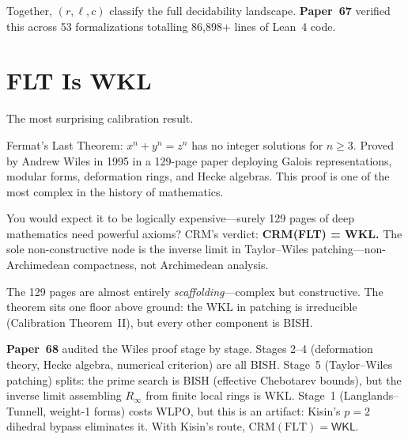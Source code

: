 \documentclass[11pt,twoside,openany]{report}
\theoremstyle{remark}
\newcommand{\BISH}{\textsf{BISH}}
\newcommand{\WKL}{\textsf{WKL}}
\newcommand{\WLPO}{\textsf{WLPO}}
\newcommand{\paperref}[1]{\textbf{Paper~#1}}
\begin{document}
Together, $(r, \ell, c)$ classify the full decidability landscape. \paperref{67} verified this across 53 formalizations totalling 86,898+ lines of Lean~4 code.


\section{FLT Is \WKL}\label{sec:flt}

The most surprising calibration result.

\begin{analogybox}
Fermat's Last Theorem: $x^n + y^n = z^n$ has no integer solutions for $n \geq 3$. Proved by Andrew Wiles in 1995 in a 129-page paper deploying Galois representations, modular forms, deformation rings, and Hecke algebras. This proof is one of the most complex in the history of mathematics.

You would expect it to be logically expensive---surely 129 pages of deep mathematics need powerful axioms? CRM's verdict: \textbf{CRM(FLT) = \WKL.} The sole non-constructive node is the inverse limit in Taylor--Wiles patching---non-Archimedean compactness, not Archimedean analysis.

The 129 pages are almost entirely \emph{scaffolding}---complex but constructive. The theorem sits one floor above ground: the \WKL{} in patching is irreducible (Calibration Theorem~II), but every other component is \BISH.
\end{analogybox}

\paperref{68} audited the Wiles proof stage by stage. Stages 2--4 (deformation theory, Hecke algebra, numerical criterion) are all \BISH. Stage~5 (Taylor--Wiles patching) splits: the prime search is \BISH{} (effective Chebotarev bounds), but the inverse limit assembling $R_\infty$ from finite local rings is \WKL. Stage~1 (Langlands--Tunnell, weight-1 forms) costs \WLPO, but this is an artifact: Kisin's $p=2$ dihedral bypass eliminates it. With Kisin's route, $\mathrm{CRM}(\mathrm{FLT}) = \WKL$.
\end{document}
